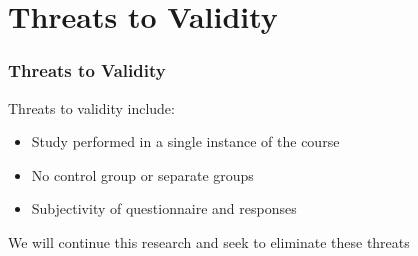 \documentclass[10pt, compress, aspectratio=169]{beamer}
\begin{document}
\section{Threats to Validity}

\begin{frame}
    \frametitle{Threats to Validity}
    \alert{Threats to validity} include:

    \begin{itemize}
        \item Study performed in a \alert{single instance of the course}
            \pause
        \item No \alert{control group} or separate groups
            \pause
        \item \alert{Subjectivity} of questionnaire and responses
    \end{itemize}

    \pause

    We will continue this research and seek to eliminate these threats
\end{frame}

\maketitle
\end{document}
